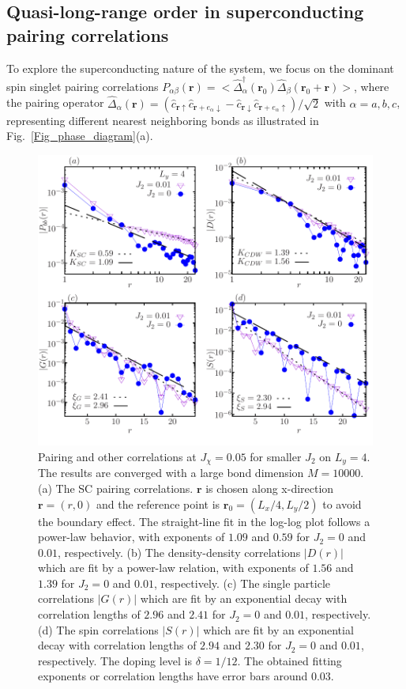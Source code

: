 \documentclass[aps,prx,reprint,superscriptaddress,showpacs]{revtex4-2}
\newcommand{\oim}[1]{{\color{blue} #1}}
\begin{document}
\subsection{Quasi-long-range order in superconducting pairing correlations}
\label{SC_correlation}
To explore the superconducting nature of the system,  we focus on  the dominant spin singlet pairing correlations $P_{\alpha \beta }(\mathbf{r})=<\widehat{\Delta} ^{\dagger }_{\alpha }(\mathbf{r}_{0})\widehat{\Delta} _{\beta }(\mathbf{r}_{0}+\mathbf{r})>$, where the pairing operator $\widehat{\Delta} _{\alpha }(\mathbf{r})=(\widehat{c}_{\mathbf{r}\uparrow}\widehat{c}_{\mathbf{r}+e_{\alpha }\downarrow}-\widehat{c}_{\mathbf{r}\downarrow}\widehat{c}_{\mathbf{r}+e_{\alpha }\uparrow})/\sqrt{2}$  with $\alpha = a,b,c$, representing different nearest neighboring bonds as illustrated in Fig.~\ref{Fig_phase_diagram}(a). 

\begin{figure}
\centering
\includegraphics[width=1\linewidth]{SC_density_correlation_SC1.pdf}
\caption{\oim{Pairing and other correlations at $J_{\chi}=0.05$ for smaller $J_{2}$ on $L_{y}=4$. The results are converged with a large bond dimension $M=10000$. (a) The SC pairing correlations. $\mathbf{r}$ is chosen along x-direction $\mathbf{r}=(r,0)$ and the reference point is $\mathbf{r}_{0}=(L_{x}/4,L_{y}/2)$ to avoid the boundary effect. The straight-line fit in the log-log plot follows a power-law behavior, with  exponents of $1.09$ and $0.59$ for $J_{2}=0$ and $0.01$, respectively. (b) The density-density correlations $\left |D(r)\right |$ which are fit by a power-law relation, with  exponents of $1.56$ and $1.39$ for $J_{2}=0$ and $0.01$, respectively. (c) The single particle correlations $\left |G(r)\right |$ which are fit by an exponential decay with  correlation lengths of $2.96$ and $2.41$ for $J_{2}=0$ and $0.01$, respectively. (d) The spin correlations $\left |S(r)\right |$ which are fit by an exponential decay with  correlation lengths of $2.94$ and $2.30$ for $J_{2}=0$ and $0.01$, respectively. The doping level is $\delta=1/12$. The obtained fitting exponents or correlation lengths have  error bars around 0.03.}}
\label{Fig_SC1}
\end{figure}
\end{document}
